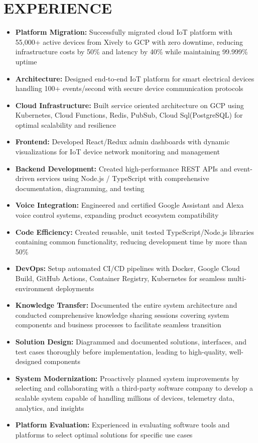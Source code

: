\documentclass{fullstackdeveloper-ats}
\begin{document}
\section{EXPERIENCE}


\begin{itemize}
    \item \textbf{Platform Migration:} Successfully migrated cloud IoT platform with 55,000+ active devices from Xively to GCP with zero downtime, reducing infrastructure costs by 50\% and latency by 40\% while maintaining 99.999\% uptime
    \item \textbf{Architecture:} Designed end-to-end IoT platform for smart electrical devices handling 100+ events/second with secure device communication protocols
    \item \textbf{Cloud Infrastructure:} Built service oriented architecture on GCP using Kubernetes, Cloud Functions, Redis, PubSub, Cloud Sql(PostgreSQL) for optimal scalability and resilience
    \item \textbf{Frontend:} Developed React/Redux admin dashboards with dynamic visualizations for IoT device network monitoring and management
    \item \textbf{Backend Development:} Created high-performance REST APIs and event-driven services using Node.js / TypeScript with comprehensive documentation, diagramming, and testing
    \item \textbf{Voice Integration:} Engineered and certified Google Assistant and Alexa voice control systems, expanding product ecosystem compatibility
    \item \textbf{Code Efficiency:} Created reusable, unit tested TypeScript/Node.js libraries containing common functionality, reducing development time by more than 50\%
    \item \textbf{DevOps:} Setup automated CI/CD pipelines with Docker, Google Cloud Build, GitHub Actions, Container Registry, Kubernetes for seamless multi-environment deployments
    \item \textbf{Knowledge Transfer:} Documented the entire system architecture and conducted comprehensive knowledge sharing sessions covering system components and business processes to facilitate seamless transition
    \item \textbf{Solution Design:} Diagrammed and documented solutions, interfaces, and test cases thoroughly before implementation, leading to high-quality, well-designed components
    \item \textbf{System Modernization:} Proactively planned system improvements by selecting and collaborating with a third-party software company to develop a scalable system capable of handling millions of devices, telemetry data, analytics, and insights
    \item \textbf{Platform Evaluation:} Experienced in evaluating software tools and platforms to select optimal solutions for specific use cases
\end{itemize}
\end{document}
